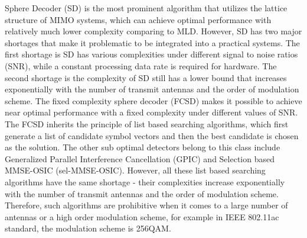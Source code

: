 Sphere Decoder (SD)\cite{damen2003maximum} is the most prominent algorithm that utilizes the lattice structure of MIMO systems, which can achieve optimal performance with relatively much lower complexity comparing to MLD. However, SD has two major shortages that make it problematic to be integrated into a practical systems. The first shortage is SD has various complexities under different signal to noise ratios (SNR), while a constant processing data rate is required for hardware. The second shortage is the complexity of SD still has a lower bound that increases exponentially with the number of transmit antennas and the order of modulation scheme\cite{jalden2005complexity}.
The fixed complexity sphere decoder (FCSD)\cite{barbero2008fixing} makes it possible to achieve near optimal performance with a fixed complexity under different values of SNR. The FCSD inherits the principle of list based searching algorithms, which first generate a list of candidate symbol vectors and then the best candidate is chosen as the solution. The other sub optimal detectors belong to this class include Generalized Parallel Interference Cancellation (GPIC)\cite{luo2008generalized} and Selection based MMSE-OSIC (sel-MMSE-OSIC)\cite{radji2009interference}. However, all these list based searching algorithms have the same shortage - their complexities increase exponentially with the number of transmit antennas and the order of modulation scheme\cite{radji2009interference}. Therefore, such algorithms are prohibitive when it comes to a large number of antennas or a high order modulation scheme, for example in IEEE 802.11ac standard\cite{IEEE802.11ac}, the modulation scheme is 256QAM. 
 
